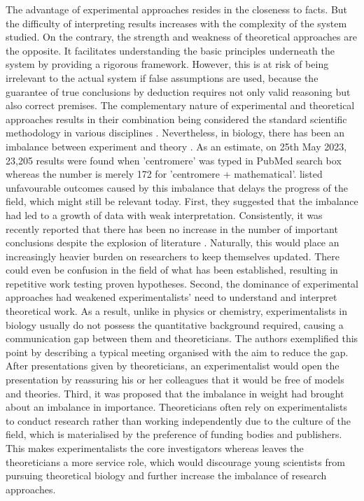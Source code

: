 The advantage of experimental approaches resides in the closeness to facts. But the difficulty of interpreting results increases with the complexity of the system studied. On the contrary, the strength and weakness of theoretical approaches are the opposite. It facilitates understanding the basic principles underneath the system by providing a rigorous framework. However, this is at risk of being irrelevant to the actual system if false assumptions are used, because the guarantee of true conclusions by deduction requires not only valid reasoning but also correct premises. The complementary nature of experimental and theoretical approaches results in their combination being considered the standard scientific methodology in various disciplines \citep{Platt1964StrongInference}. Nevertheless, in biology, there has been an imbalance between experiment and theory \citep{Fidelman1985TheModeling}. As an estimate, on 25th May 2023, 23,205 results were found when 'centromere' was typed in PubMed search box whereas the number is merely 172 for 'centromere + mathematical'. \cite{Fidelman1985TheModeling} listed unfavourable outcomes caused by this imbalance that delays the progress of the field, which might still be relevant today. First, they suggested that the imbalance had led to a growth of data with weak interpretation. Consistently, it was recently reported that there has been no increase in the number of important conclusions despite the explosion of literature \citep{Park2023PapersTime, Nurse2021BiologyData}. Naturally, this would place an increasingly heavier burden on researchers to keep themselves updated. There could even be confusion in the field of what has been established, resulting in repetitive work testing proven hypotheses. Second, the dominance of experimental approaches had weakened experimentalists' need to understand and interpret theoretical work. As a result, unlike in physics or chemistry, experimentalists in biology usually do not possess the quantitative background required, causing a communication gap between them and theoreticians. The authors exemplified this point by describing a typical meeting organised with the aim to reduce the gap. After presentations given by theoreticians, an experimentalist would open the presentation by reassuring his or her colleagues that it would be free of models and theories. Third, it was proposed that the imbalance in weight had brought about an imbalance in importance. Theoreticians often rely on experimentalists to conduct research rather than working independently due to the culture of the field, which is materialised by the preference of funding bodies and publishers. This makes experimentalists the core investigators whereas leaves the theoreticians a more service role, which would discourage young scientists from pursuing theoretical biology and further increase the imbalance of research approaches. 

